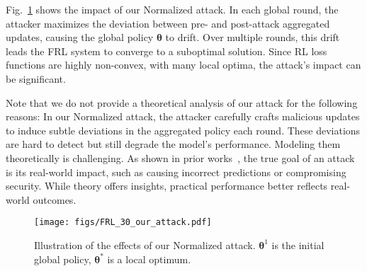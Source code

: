 Fig.~\ref{our_attack_fig} shows the impact of our Normalized attack. In each global round, the attacker maximizes the deviation between pre- and post-attack aggregated updates, causing the global policy $\bm{\theta}$ to drift. Over multiple rounds, this drift leads the FRL system to converge to a suboptimal solution. Since RL loss functions are highly non-convex, with many local optima, the attack’s impact can be significant.



Note that we do not provide a theoretical analysis of our attack for the following reasons: In our Normalized attack, the attacker carefully crafts malicious updates to induce subtle deviations in the aggregated policy each round. These deviations are hard to detect but still degrade the model's performance. Modeling them theoretically is challenging. As shown in prior works~\cite{fang2020local,shejwalkar2021manipulating}, the true goal of an attack is its real-world impact, such as causing incorrect predictions or compromising security. While theory offers insights, practical performance better reflects real-world outcomes.



\begin{figure}[!t]
	\centering
	{\texttt{[image: figs/FRL\_30\_our\_attack.pdf]}}
	\vspace{1mm}
	\caption{Illustration of the effects of our Normalized attack. $\bm{\theta}^1$ is the initial global policy, $\bm{\theta}^*$ is a local optimum.}
	\label{our_attack_fig}
\end{figure}




